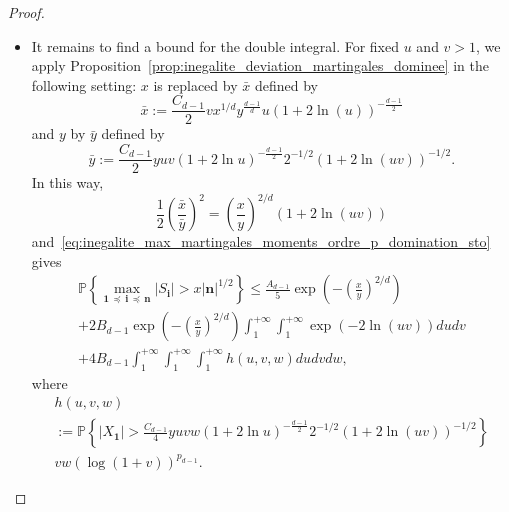 \documentclass[AHL,Unicode,longabstracts,published]{cedram}
\newcommand\PP{\mathbb{P}}
\newcommand{\pr}[1]{(#1)}
\newcommand{\gr}[1]{\bm{#1}}
\newcommand{\gri}{\bm{i}}
\newcommand{\grn}{\bm{n}}
\newcommand{\imd}{\preccurlyeq}
\begin{document}
\begin{proof}
\begin{itemize}
\begin{multline}
\PP\left\{\max_{\gr{1}\,\imd\,\gri\,\imd\,\gr{n}} \left|S_{\gri}\right| >x\left|\grn\right|^{1/2}\right\} \leq
\frac{A_{d-1}}5\exp\left(-\left(\frac xy\right)^{2/d}\right)\\
+ B_{d-1}\int_1^{+\infty}\int_1^{+\infty}\PP\left\{
\left|\sum_{i_d=1}^{n_d}X_{1,\,\dots,\,1,i_d}\right|>\frac{C_{d-1}}2vn_d^{1/2}x^{1/d}y^{\frac{d-1}d}u
\left(1+2\ln\pr{ u}\right)^{-\frac{d-1}2} \right\}\\
v\left(\log\pr{1+v}\right)^{p_{d-1}}dudv.
\end{multline}
\item[\eqref{step3}] It remains to find a bound for the double integral. For fixed $u$ and $v>1$, we apply Proposition~\ref{prop:inegalite_deviation_martingales_dominee} in the following setting: $x$ is replaced by $\bar{x}$ defined by
\begin{equation}
\bar{x}:=\frac{C_{d-1}}2v x^{1/d}y^{\frac{d-1}d}u
\left(1+2\ln\pr{ u}\right)^{-\frac{d-1}2}
\end{equation}
and $y$ by $\bar{y}$ defined by
\begin{equation}
\bar{y}:= \frac{C_{d-1}}2yuv\left(1+2\ln u\right)^{-\frac{d-1}2} 2^{-1/2}\left(1+2\ln\left(uv\right)\right)^{-1/2}.
\end{equation}
In this way,
\begin{equation}
\frac 12\left(\frac{\bar{x}}{\bar{y}}\right)^2 =\left(\frac{x}y\right)^{2/d}\left(1+2\ln\left(uv\right)\right)
\end{equation}
and~\eqref{eq:inegalite_max_martingales_moments_ordre_p_domination_sto} gives
\begin{multline}\label{eq:estimated_last_step}
\PP\left\{\max_{\gr{1}\,\imd\,\gri\,\imd\,\gr{n}} \left|S_{\gri} \right| >x\left|\grn\right|^{1/2}\right\} \leq
\frac{A_{d-1}}5\exp\left(-\left(\frac xy\right)^{2/d}\right)\\+ 2B_{d-1}\exp\left(-\left(\frac{x}{y}\right)^{2/d}\right)\int_1^{+\infty}\int_1^{+\infty}
\exp\pr{-2\ln\pr{uv}}dudv\\
+ 4B_{d-1}\int_1^{+\infty}\int_1^{+\infty}\int_1^{+\infty} h\pr{u,v,w}dudvdw,
\end{multline}
where
\begin{multline}
h\pr{u,v,w}\\
{:=}\PP\left\{\left|X_{\gr{1}}\right|>
\frac{C_{d-1}}4yuvw\left(1+2\ln u\right)^{-\frac{d-1}2} 2^{-1/2}\left(1+2\ln\pr{uv}\right)^{-1/2} \right\}\\ vw\left(\log\pr{1+v}\right)^{p_{d-1}}.
\end{multline}

\end{itemize}
\end{proof}
\end{document}
